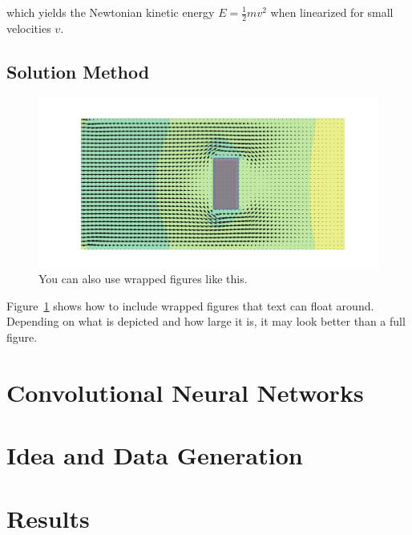 \documentclass[11pt,table]{article}
\begin{document}
which yields the Newtonian kinetic energy $E = \frac 1 2 m v^2$ when linearized for small velocities $v$.

\subsection{Solution Method}
\begin{figure}
	\centering
	\includegraphics[scale=1.0]{Figures/example_cover.png}
	\caption{You can also use wrapped figures like this.}
	\label{fig:wrapfigure_example}
\end{figure}
Figure~\ref{fig:wrapfigure_example} shows how to include wrapped figures that text can float around. Depending on what is depicted and how large it is, it may look better than a full figure.

\section{Convolutional Neural Networks}


\section{Idea and Data Generation}


\section{Results}

\end{document}
